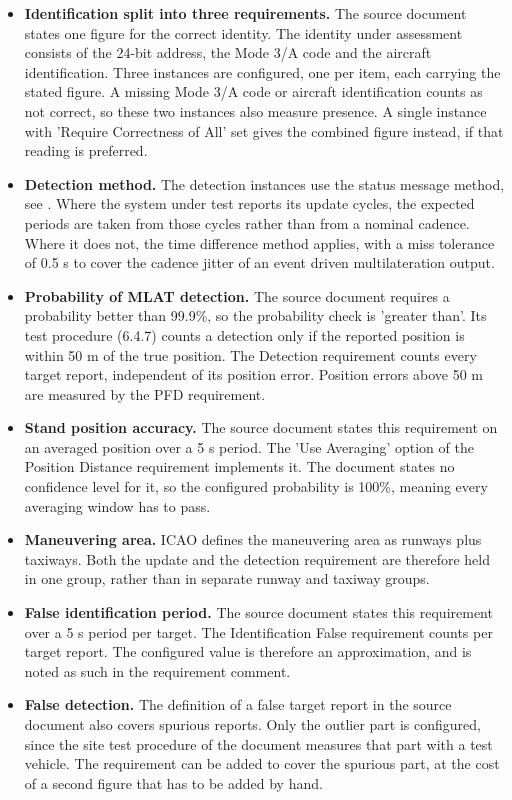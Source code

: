 \begin{itemize}
\item \textbf{Identification split into three requirements.} The source document states one figure for the correct identity. The identity under assessment consists of the 24-bit address, the Mode 3/A code and the aircraft identification. Three instances are configured, one per item, each carrying the stated figure. A missing Mode 3/A code or aircraft identification counts as not correct, so these two instances also measure presence. A single instance with 'Require Correctness of All' set gives the combined figure instead, if that reading is preferred.
\item \textbf{Detection method.} The detection instances use the status message method, see . Where the system under test reports its update cycles, the expected periods are taken from those cycles rather than from a nominal cadence. Where it does not, the time difference method applies, with a miss tolerance of 0.5 s to cover the cadence jitter of an event driven multilateration output.
\item \textbf{Probability of MLAT detection.} The source document requires a probability better than 99.9\%, so the probability check is 'greater than'. Its test procedure (6.4.7) counts a detection only if the reported position is within 50 m of the true position. The Detection requirement counts every target report, independent of its position error. Position errors above 50 m are measured by the PFD requirement.
\item \textbf{Stand position accuracy.} The source document states this requirement on an averaged position over a 5 s period. The 'Use Averaging' option of the Position Distance requirement implements it. The document states no confidence level for it, so the configured probability is 100\%, meaning every averaging window has to pass.
\item \textbf{Maneuvering area.} ICAO defines the maneuvering area as runways plus taxiways. Both the update and the detection requirement are therefore held in one group, rather than in separate runway and taxiway groups.
\item \textbf{False identification period.} The source document states this requirement over a 5 s period per target. The Identification False requirement counts per target report. The configured value is therefore an approximation, and is noted as such in the requirement comment.
\item \textbf{False detection.} The definition of a false target report in the source document also covers spurious reports. Only the outlier part is configured, since the site test procedure of the document measures that part with a test vehicle. The  requirement can be added to cover the spurious part, at the cost of a second figure that has to be added by hand.
\end{itemize}
\ \\

